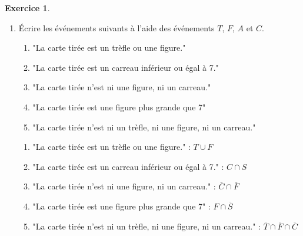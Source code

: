 \documentclass[12pt,a4paper]{article}
\theoremstyle{definition}
\newtheorem{exo}{Exercice}
\begin{document}
\begin{exo}
\begin{enumerate}
\begin{rep}{}{}
\end{rep}
        
        \item Écrire les événements suivants à l’aide des événements $T$, $F$, $A$ et $C$.
        
    \begin{enumerate}
        \item "La carte tirée est un trèfle ou une figure."
        \item "La carte tirée est un carreau inférieur ou égal à 7."
        \item "La carte tirée n'est ni une figure, ni un carreau."
        \item "La carte tirée est une figure plus grande que 7"
        \item "La carte tirée n'est ni un trèfle, ni une figure, ni un carreau."
    \end{enumerate}

    \begin{rep}{}{}

         
    \begin{enumerate}
        \item "La carte tirée est un trèfle ou une figure." : $T \cup F$
        \item "La carte tirée est un carreau inférieur ou égal à 7." : $C \cap S$
        \item "La carte tirée n'est ni une figure, ni un carreau." : $\overline{C} \cap \overline{F}$
        \item "La carte tirée est une figure plus grande que 7" : $F \cap \overline{S}$
        \item "La carte tirée n'est ni un trèfle, ni une figure, ni un carreau." : $\overline{T} \cap \overline{F} \cap \overline{C}$
    \end{enumerate}
    

    \end{rep}
    
\end{enumerate}

\end{exo}
\end{document}
